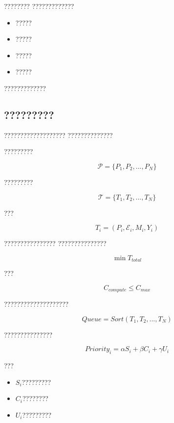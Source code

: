 ????????
?????????????

\begin{itemize}
    \item ?????
    \item ?????
    \item ?????
    \item ?????
\end{itemize}

?????????????


\subsection*{?????????}

???????????????????
??????????????

?????????

\begin{equation}
\mathcal{P}
=
\{
P_1,P_2,...,P_N
\}
\end{equation}


?????????

\begin{equation}
\mathcal{T}
=
\{
T_1,T_2,...,T_N
\}
\end{equation}


???

\begin{equation}
T_i
=
(
P_i,
\mathcal{E}_i,
M_i,
Y_i
)
\end{equation}


????????????????
???????????????

\begin{equation}
\min
T_{total}
\end{equation}

???

\begin{equation}
C_{compute}
\leq
C_{max}
\end{equation}


????????????????????

\begin{equation}
Queue
=
Sort
(
T_1,T_2,...,T_N
)
\end{equation}


???????????????

\begin{equation}
Priority_i
=
\alpha S_i
+
\beta C_i
+
\gamma U_i
\end{equation}

???

\begin{itemize}
    \item $S_i$?????????
    \item $C_i$????????
    \item $U_i$?????????
\end{itemize}


